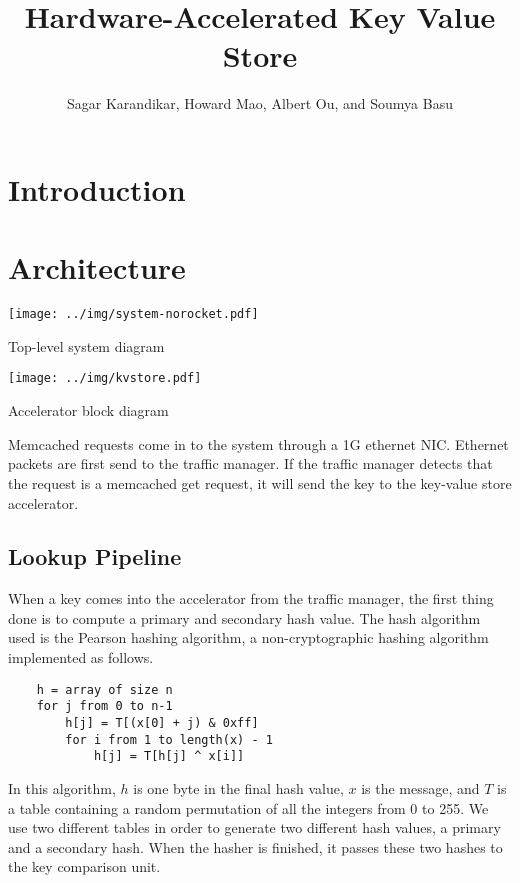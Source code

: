 \documentclass{article}
\title{Hardware-Accelerated Key Value Store}
\author{Sagar Karandikar, Howard Mao, Albert Ou, and Soumya Basu}
\begin{document}
\maketitle

\section{Introduction}

\section{Architecture}

\begin{minipage}{0.3\linewidth}
    \centering
    \texttt{[image: ../img/system-norocket.pdf]}

    Top-level system diagram
\end{minipage}\qquad
\begin{minipage}{0.6\linewidth}
    \centering
    \texttt{[image: ../img/kvstore.pdf]}

    Accelerator block diagram
\end{minipage}

\vspace{2ex}

Memcached requests come in to the system through a 1G ethernet NIC.
Ethernet packets are first send to the traffic manager. If the traffic manager
detects that the request is a memcached get request, it will send the key to
the key-value store accelerator.

\subsection{Lookup Pipeline}

When a key comes into the accelerator from the traffic manager, the first thing
done is to compute a primary and secondary hash value. The hash algorithm used
is the Pearson hashing algorithm, a non-cryptographic hashing algorithm
implemented as follows.

\begin{verbatim}
    h = array of size n
    for j from 0 to n-1
        h[j] = T[(x[0] + j) & 0xff]
        for i from 1 to length(x) - 1
            h[j] = T[h[j] ^ x[i]]
\end{verbatim}

In this algorithm, \(h\) is one byte in the final hash value,
\(x\) is the message, and \(T\) is a table containing a random permutation of
all the integers from 0 to 255. We use two different tables in order to
generate two different hash values, a primary and a secondary hash. When the
hasher is finished, it passes these two hashes to the key comparison unit.
\end{document}
